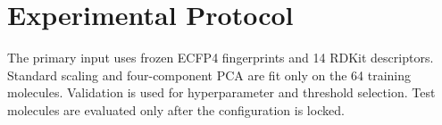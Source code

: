 \section{Experimental Protocol}
The primary input uses frozen ECFP4 fingerprints and 14 RDKit descriptors. Standard
scaling and four-component PCA are fit only on the 64 training molecules. Validation
is used for hyperparameter and threshold selection. Test molecules are evaluated only
after the configuration is locked.
